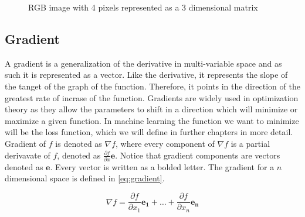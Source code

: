 \documentclass[times, utf8, diplomski]{fer}
\begin{document}
\begin{figure}
\centering
{}
\caption{RGB image with 4 pixels  represented as a 3 dimensional matrix}
\label{fig:image_matrix}
\end{figure}

\subsection{Gradient}
A gradient is a generalization of the derivative in multi-variable space and as such it is represented as a vector. Like the derivative, it represents the slope of the tanget of the graph of the function. Therefore, it points in the direction of the greatest rate of incrase of the function. Gradients are widely used in optimization theory as they allow the parameters to shift in a direction which will minimize or maximize a given function. In machine learning the function we want to minimize will be the loss function, which we will define in further chapters in more detail. Gradient of $f$ is denoted as $\nabla{f}$, where every component of $\nabla{f}$ is a partial derivavate of $f$, denoted as $\frac{\partial{f}}{\partial{x}}\mathbf{e}$. Notice that gradient components are vectors denoted as $\mathbf{e}$. Every vector is written as a bolded letter. The gradient for a $n$ dimensional space is defined in \ref{eq:gradient}.

\begin{equation} \label{eq:gradient}
    \nabla{f}= \frac{\partial{f}}{\partial{x_{1}}}\mathbf{e_1} + \hdots + 	   \frac{\partial{f}}{\partial{x_{n}}}\mathbf{e_n}
\end{equation}
\end{document}
